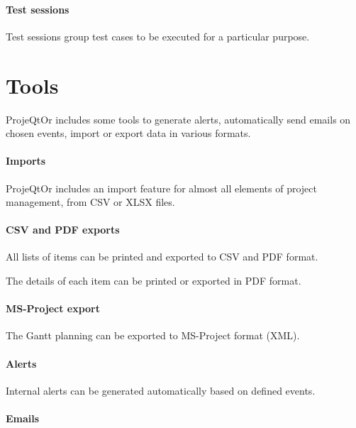 \documentclass[letterpaper,10pt,english]{sphinxmanual}
\begin{document}
\paragraph{Test sessions}

Test sessions group test cases to be executed for a particular purpose.
\newpage
{}

\section{Tools}
\label{Features:index-47}\label{Features:tools}
ProjeQtOr includes some tools to generate alerts, automatically send emails on chosen events, import or export data in various formats.

\paragraph{Imports}

ProjeQtOr includes an import feature for almost all elements of project management, from CSV or XLSX files.

\paragraph{CSV and PDF exports}

All lists of items can be printed and exported to CSV and PDF format.

The details of each item can be printed or exported in PDF format.

\paragraph{MS-Project export}

The Gantt planning can be exported to MS-Project format (XML).

\paragraph{Alerts}

Internal alerts can be generated automatically based on defined events.

\paragraph{Emails}
\end{document}
